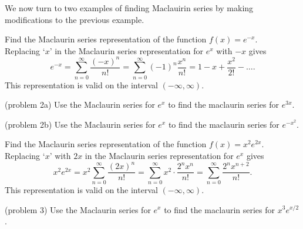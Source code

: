 \documentclass{ximera}
\begin{document}
We now turn to two examples of finding Maclauirin series by making modifications to the previous example.

\begin{example}[example 2] 
Find the Maclaurin series representation of the function $f(x) = e^{-x}$.\\
Replacing `$x$' in the Maclaurin series representation for $e^x$ with $-x$ gives
\[
e^{-x} = \sum_{n=0}^\infty \frac{(-x)^n}{n!} = \sum_{n=0}^\infty (-1)^n \frac{x^n}{n!} = 1 - x + \frac{x^2}{2!} - \dots.
\]
This representation is valid on the interval $(-\infty, \infty)$.
\end{example}

\begin{problem}(problem 2a)
Use the Maclaurin series for $e^x$ to find the maclaurin series for $e^{3x}$.
\begin{multipleChoice}
\end{multipleChoice}
\end{problem}


\begin{problem}(problem 2b)
Use the Maclaurin series for $e^x$ to find the maclaurin series for $e^{-x^2}$.
\begin{multipleChoice}
\end{multipleChoice}
\end{problem}

\begin{example}[example 3] 
Find the Maclaurin series representation of the function $f(x) = x^2 e^{2x}$.\\
Replacing `$x$' with $2x$ in the Maclaurin series representation for $e^x$ gives
\[
x^2 e^{2x} = x^2\sum_{n=0}^\infty \frac{(2x)^n}{n!} = \sum_{n=0}^\infty x^2 \cdot \frac{2^n x^n}{n!} = \sum_{n=0}^\infty \frac{2^n x^{n+2}}{n!}.
\]
This representation is valid on the interval $(-\infty, \infty)$.
\end{example}




\begin{problem}(problem 3)
Use the Maclaurin series for $e^x$ to find the maclaurin series for $x^3e^{x/2}$.
\begin{multipleChoice}
\end{multipleChoice}
\end{problem}
\end{document}
